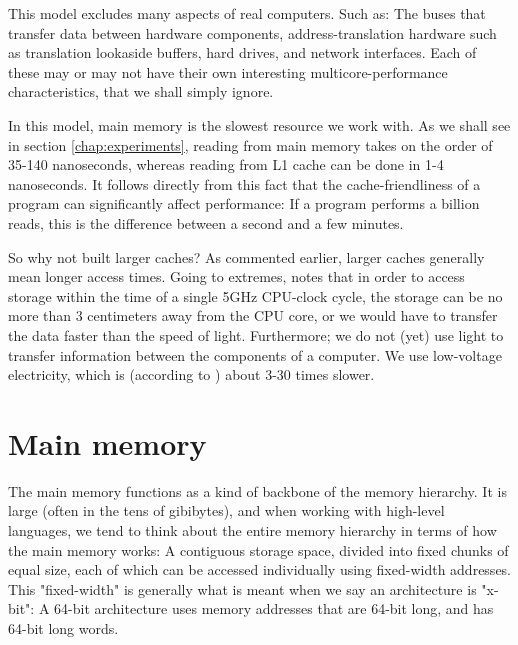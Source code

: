 This model excludes many aspects of real computers. Such as: The buses that
transfer data between hardware components, address-translation hardware such as
translation lookaside buffers, hard drives, and network interfaces. Each of
these may or may not have their own interesting multicore-performance
characteristics, that we shall simply ignore.

In this model, main memory is the slowest resource we work with. As we shall see
in section \ref{chap:experiments}, reading from main memory takes on the
order of 35-140 nanoseconds, whereas reading from L1 cache can be done in 1-4
nanoseconds. It follows directly from this fact that the cache-friendliness of a
program can significantly affect performance: If a program performs a billion
reads, this is the difference between a second and a few minutes.

So why not built larger caches? As commented earlier, larger caches generally
mean longer access times. Going to extremes, \citeauthor{mckenney} \cite{mckenney} notes that in order
to access storage within the time of a single 5GHz CPU-clock cycle, the storage
can be no more than 3 centimeters away from the CPU core, or we would have to
transfer the data faster than the speed of light. Furthermore; we do not (yet)
use light to transfer information between the components of a computer. We use
low-voltage electricity, which is (according to \cite{mckenney}) about 3-30
times slower.

\section{Main memory}
The main memory functions as a kind of backbone of the memory hierarchy. It is
large (often in the tens of gibibytes), and when working with high-level
languages, we tend to think about the entire memory
hierarchy in terms of how the main memory works: A contiguous storage space,
divided into fixed chunks of equal size, each of which can be
accessed individually using fixed-width addresses. This "fixed-width" is
generally what is meant when we say an architecture is "x-bit": A 64-bit
architecture uses memory addresses that are 64-bit long, and has 64-bit long
words.

